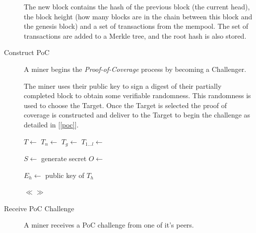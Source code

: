 \documentclass[UTF8, 10pt, nonatbib, nocopyrightspace, reprint]{sigplanconf}
\newenvironment{protocol}[2]{
  \begin{algorithm}[!htb]
    \DontPrintSemicolon
    \caption{#1}\label{#2}
}{
  \end{algorithm}
  \FloatBarrier
}
\newcommand{\secref}[1]{[\autoref{#1}]}
\begin{document}
\begin{description}
    The new block contains the hash of the previous block (the current head), the block height (how many blocks are in the chain between this block and the genesis block) and a set of transactions from the mempool. The set of transactions are added to a Merkle tree, and the root hash is also stored.

  \item [Construct PoC] A miner begins the \emph{Proof-of-Coverage} process by becoming a Challenger.

    The miner uses their public key to sign a digest of their partially completed block to obtain some verifiable randomness. This randomness is used to choose the Target. Once the Target is selected the proof of coverage is constructed and deliver to the Target to begin the challenge as detailed in \secref{poc}.


    \begin{protocol}{Miner PoC Challenge}{proto:miner.poc.challenge}

       {
        $T \leftarrow $ \;
        $T_n \leftarrow $ \;
        $T_g \leftarrow $ \;
        $T_{1 \dots l} \leftarrow $ \;

        $S \leftarrow $ generate secret \;
        $O \leftarrow $  \;
      }

       {
        $E_h \leftarrow $ public key of $T_h$\;

         {
          \lCase{[]} { $ \ll \gg $}
        }
      }
    \end{protocol}



  \item [Receive PoC Challenge] A miner receives a PoC challenge from one of it's peers.


\end{description}
\end{document}
